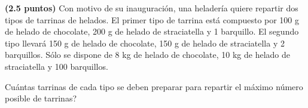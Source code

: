 
\textbf{(2.5 puntos)} Con motivo de su inauguración, una heladería quiere repartir dos tipos de tarrinas de helados. El primer tipo de tarrina está compuesto por 100 g de helado de chocolate, 200 g de helado de straciatella y 1 barquillo. El segundo tipo llevará 150 g de helado de chocolate, 150 g de helado de straciatella y 2 barquillos. Sólo se dispone de 8 kg de helado de chocolate, 10 kg de helado de straciatella y 100 barquillos.

\textquestiondown{}Cuántas tarrinas de cada tipo se deben preparar para repartir el máximo número posible de tarrinas?
